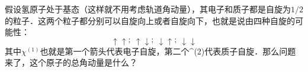 
假设氢原子处于基态（这样就不用考虑轨道角动量），其电子和质子都是自旋为$1/2$的粒子．这两个粒子都分别可以自旋向上或者自旋向下，也就是说由四种自旋的可能性：
\begin{equation}
\uparrow\uparrow;\ \uparrow\downarrow;\ \downarrow\uparrow;\ \downarrow\downarrow
\end{equation}
其中$\chi^{(1)}$也就是第一个箭头代表电子自旋，第二个\chi^{(2)}代表质子自旋．那么问题来了，这个原子的总角动量是什么？
